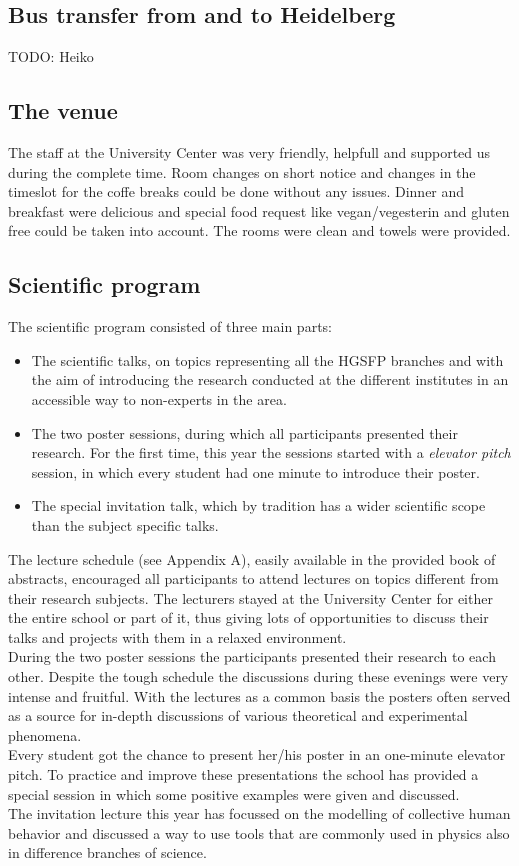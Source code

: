 \documentclass[11pt,a4paper]{article}
\numberwithin{equation}{section}
\numberwithin{table}{section}\setlength{\multlinegap}{25pt}
\begin{document}
\subsection*{Bus transfer from and to Heidelberg}
TODO: Heiko

\subsection*{The venue}

The staff at the University Center was very friendly, helpfull and supported
us during the complete time. Room changes on short notice and changes in the
timeslot for the coffe breaks could be done without any issues. 
Dinner and breakfast were delicious and special food request like
vegan/vegesterin and gluten free could be taken into account.\newline
The rooms were clean and towels were provided. 
\subsection*{Scientific program}

\noindent The scientific program consisted of three main parts:
\begin{itemize}
\item The scientific talks, on topics representing all the HGSFP branches and with the aim of introducing the research conducted at the different institutes in an accessible way to non-experts in the area.
\item The two poster sessions, during which all participants presented their research. For the first time, this year the sessions started with a \textit{elevator pitch} session, in which every student had one minute to introduce their poster.
\item The special invitation talk, which by tradition has a wider scientific scope than the subject specific talks.
\end{itemize}

The lecture schedule (see Appendix A), easily available in the provided book of abstracts, encouraged all participants to attend lectures on topics different from their research subjects. The lecturers stayed at the University Center for either the entire school or part of it, thus giving lots of opportunities to discuss their talks and projects with them in a relaxed environment. \\
During the two poster sessions the participants presented their research to each other. Despite the tough schedule the discussions during these evenings were very intense and fruitful. With the lectures as a common basis the posters often served as a source for in-depth discussions of various theoretical and experimental phenomena.\\
Every student got the chance to present her/his poster in an one-minute elevator pitch. To practice and improve these presentations the school has provided a special session in which some positive examples were given and discussed.\\
The invitation lecture this year has focussed on the modelling of collective human behavior and discussed a way to use tools that are commonly used in physics also in difference branches of science. 
\end{document}
